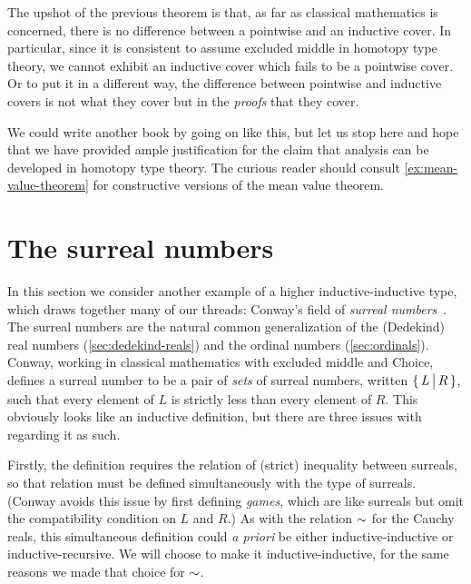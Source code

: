 The upshot of the previous theorem is that, as far as classical mathematics is concerned,
there is no difference between a pointwise and an inductive cover. In particular, since it
is consistent to assume excluded middle in homotopy type theory, we cannot exhibit an
inductive cover which fails to be a pointwise cover. Or to put it in a different way, the
difference between pointwise and inductive covers is not what they cover but in the
\emph{proofs} that they cover. 

We could write another book by going on like this, but let us stop here and hope that we
have provided ample justification for the claim that analysis can be developed in homotopy
type theory. The curious reader should consult \autoref{ex:mean-value-theorem} for
constructive versions of the mean value theorem.


%
%

\section{The surreal numbers}
\label{sec:surreals}

%

In this section we consider another example of a higher inductive-in\-duc\-tive type, which draws together many of our threads: Conway's field \NO of \emph{surreal numbers}~\cite{conway:onag}.
The surreal numbers are the natural common generalization of the (Dedekind) real numbers (\autoref{sec:dedekind-reals}) and the ordinal numbers (\autoref{sec:ordinals}).
Conway, working in classical mathematics with excluded middle and Choice, defines a surreal number to be a pair of \emph{sets} of surreal numbers, written $\{\,L\,\big|\,R\,\}$, such that every element of $L$ is strictly less than every element of $R$.
This obviously looks like an inductive definition, but there are three issues with regarding it as such.

Firstly, the definition requires the relation of (strict) inequality between surreals, so that relation must be defined simultaneously with the type \NO of surreals.
(Conway avoids this issue by first defining \emph{games}, which are like surreals but omit the compatibility condition on $L$ and $R$.)
As with the relation $\mathord\sim$ for the Cauchy reals, this simultaneous definition could \emph{a priori} be either inductive-inductive or inductive-recursive.
We will choose to make it inductive-inductive, for the same reasons we made that choice for $\mathord\sim$.

